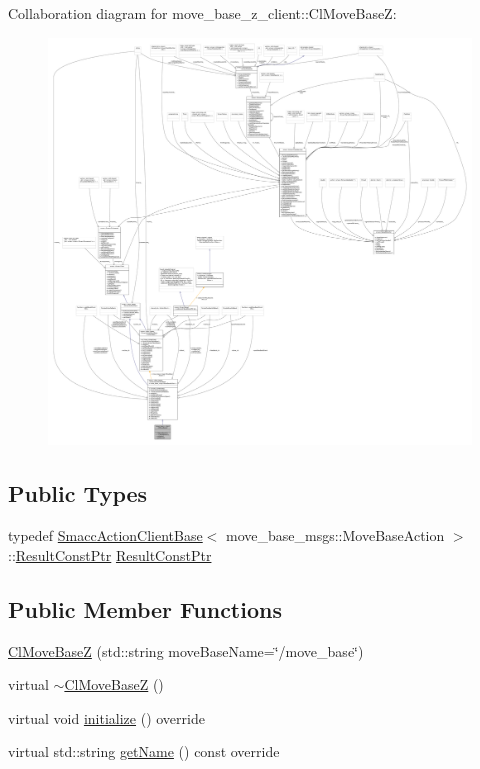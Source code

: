 Collaboration diagram for move\+\_\+base\+\_\+z\+\_\+client\+:\+:Cl\+Move\+BaseZ\+:
\nopagebreak
\begin{figure}[H]
\begin{center}
\leavevmode
\includegraphics[width=350pt]{classmove__base__z__client_1_1ClMoveBaseZ__coll__graph}
\end{center}
\end{figure}
\subsection*{Public Types}
\begin{DoxyCompactItemize}
\item 
typedef \hyperlink{classsmacc_1_1client__bases_1_1SmaccActionClientBase_af38f27dd26f8a87fea6b3eaa4a84e604}{Smacc\+Action\+Client\+Base}$<$ move\+\_\+base\+\_\+msgs\+::\+Move\+Base\+Action $>$\+::\hyperlink{classmove__base__z__client_1_1ClMoveBaseZ_a3b774d99d3dd4526f99b968d65ef5834}{Result\+Const\+Ptr} \hyperlink{classmove__base__z__client_1_1ClMoveBaseZ_a3b774d99d3dd4526f99b968d65ef5834}{Result\+Const\+Ptr}
\end{DoxyCompactItemize}
\subsection*{Public Member Functions}
\begin{DoxyCompactItemize}
\item 
\hyperlink{classmove__base__z__client_1_1ClMoveBaseZ_a66d6c734cca9b92daf60933c0fc9f2ed}{Cl\+Move\+BaseZ} (std\+::string move\+Base\+Name=\char`\"{}/move\+\_\+base\char`\"{})
\item 
virtual \hyperlink{classmove__base__z__client_1_1ClMoveBaseZ_ab5de84b969e58d80723f5c0d3ce79afa}{$\sim$\+Cl\+Move\+BaseZ} ()
\item 
virtual void \hyperlink{classmove__base__z__client_1_1ClMoveBaseZ_a082cef8bf5dbd0ec06adfe2a7aefbf70}{initialize} () override
\item 
virtual std\+::string \hyperlink{classmove__base__z__client_1_1ClMoveBaseZ_aa7446f57e3740d89c71ba12f1f3c00c0}{get\+Name} () const override
\end{DoxyCompactItemize}

